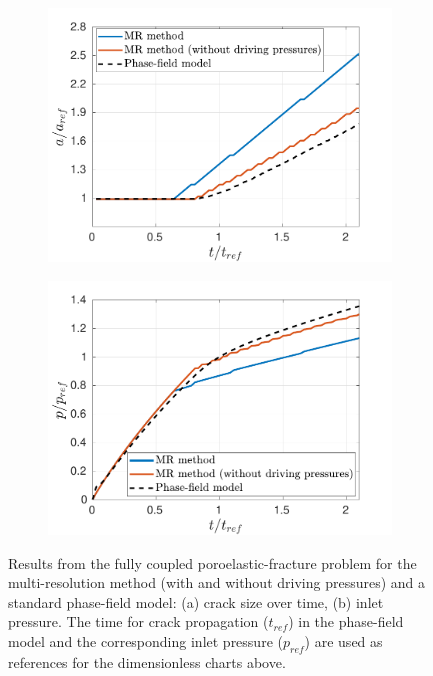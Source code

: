 \begin{figure}
\centering
\vspace{-\abovedisplayskip}
\begin{subfigure}{.5\textwidth}
  \centering
  \includegraphics[width=\linewidth]{img/comparison_prob/length.pdf}
  \caption{}
  \label{fig:results_size_miehe}
\end{subfigure}%
\begin{subfigure}{.5\textwidth}
  \centering
  \includegraphics[width=\linewidth]{img/comparison_prob/pressures.pdf}
  \caption{}
  \label{fig:results_pressure_miehe}
\end{subfigure}
  \caption{Results from the fully coupled poroelastic-fracture problem for the multi-resolution method (with and without driving pressures) and a standard phase-field model: (a) crack size over time, (b) inlet pressure.  The time for crack propagation ($t_{ref}$) in the phase-field model and the corresponding inlet pressure ($p_{ref}$) are used as references for the dimensionless charts above.}
  \label{fig:results_charts_miehe}
\end{figure}

